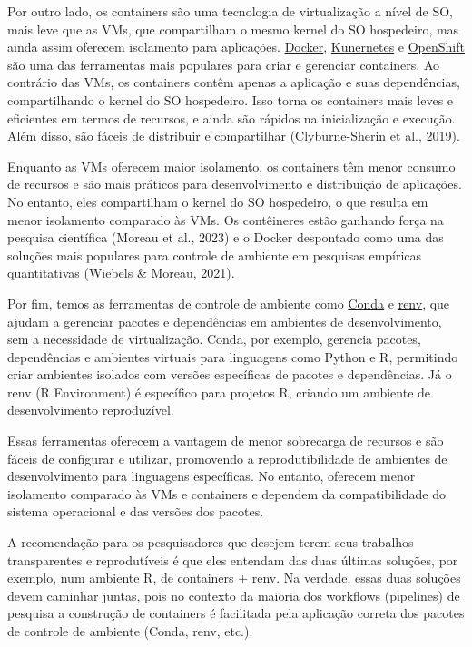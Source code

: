 \documentclass[
  a4paper,
]{book}
\begin{document}
Por outro lado, os containers são uma tecnologia de virtualização a
nível de SO, mais leve que as VMs, que compartilham o mesmo kernel do SO
hospedeiro, mas ainda assim oferecem isolamento para aplicações.
\href{https://www.docker.com/}{Docker},
\href{https://kubernetes.io/}{Kunernetes} e
\href{https://www.redhat.com/en/technologies/cloud-computing/openshift}{OpenShift}
são uma das ferramentas mais populares para criar e gerenciar
containers. Ao contrário das VMs, os containers contêm apenas a
aplicação e suas dependências, compartilhando o kernel do SO hospedeiro.
Isso torna os containers mais leves e eficientes em termos de recursos,
e ainda são rápidos na inicialização e execução. Além disso, são fáceis
de distribuir e compartilhar (Clyburne-Sherin et al., 2019).

Enquanto as VMs oferecem maior isolamento, os containers têm menor
consumo de recursos e são mais práticos para desenvolvimento e
distribuição de aplicações. No entanto, eles compartilham o kernel do SO
hospedeiro, o que resulta em menor isolamento comparado às VMs. Os
contêineres estão ganhando força na pesquisa científica (Moreau et al.,
2023) e o Docker despontado como uma das soluções mais populares para
controle de ambiente em pesquisas empíricas quantitativas (Wiebels \&
Moreau, 2021).

Por fim, temos as ferramentas de controle de ambiente como
\href{https://docs.conda.io/projects/conda/en/stable/}{Conda} e
\href{https://rstudio.github.io/renv/articles/renv.html}{renv}, que
ajudam a gerenciar pacotes e dependências em ambientes de
desenvolvimento, sem a necessidade de virtualização. Conda, por exemplo,
gerencia pacotes, dependências e ambientes virtuais para linguagens como
Python e R, permitindo criar ambientes isolados com versões específicas
de pacotes e dependências. Já o renv (R Environment) é específico para
projetos R, criando um ambiente de desenvolvimento reproduzível.

Essas ferramentas oferecem a vantagem de menor sobrecarga de recursos e
são fáceis de configurar e utilizar, promovendo a reprodutibilidade de
ambientes de desenvolvimento para linguagens específicas. No entanto,
oferecem menor isolamento comparado às VMs e containers e dependem da
compatibilidade do sistema operacional e das versões dos pacotes.

A recomendação para os pesquisadores que desejem terem seus trabalhos
transparentes e reprodutíveis é que eles entendam das duas últimas
soluções, por exemplo, num ambiente R, de containers + renv. Na verdade,
essas duas soluções devem caminhar juntas, pois no contexto da maioria
dos workflows (pipelines) de pesquisa a construção de containers é
facilitada pela aplicação correta dos pacotes de controle de ambiente
(Conda, renv, etc.).
\end{document}
